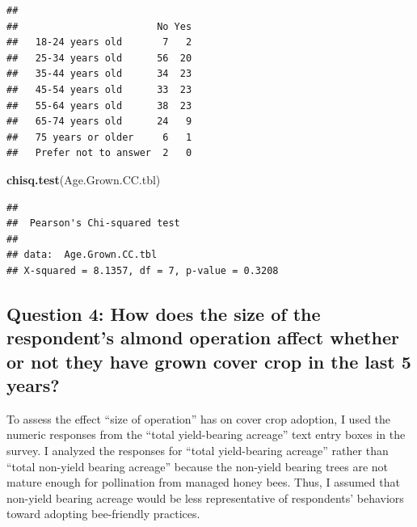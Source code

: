 \documentclass[12pt,]{article}
\newenvironment{Shaded}{\begin{snugshade}}{\end{snugshade}}
\newcommand{\KeywordTok}[1]{\textcolor[rgb]{0.13,0.29,0.53}{\textbf{#1}}}
\newcommand{\StringTok}[1]{\textcolor[rgb]{0.31,0.60,0.02}{#1}}
\newcommand{\CommentTok}[1]{\textcolor[rgb]{0.56,0.35,0.01}{\textit{#1}}}
\newcommand{\OperatorTok}[1]{\textcolor[rgb]{0.81,0.36,0.00}{\textbf{#1}}}
\newcommand{\NormalTok}[1]{#1}
\begin{document}
\FloatBarrier

\begin{Shaded}
\end{Shaded}

\begin{verbatim}
##                       
##                        No Yes
##   18-24 years old       7   2
##   25-34 years old      56  20
##   35-44 years old      34  23
##   45-54 years old      33  23
##   55-64 years old      38  23
##   65-74 years old      24   9
##   75 years or older     6   1
##   Prefer not to answer  2   0
\end{verbatim}

\begin{Shaded}
\begin{Highlighting}[]
\KeywordTok{chisq.test}\NormalTok{(Age.Grown.CC.tbl)}
\end{Highlighting}
\end{Shaded}

\begin{verbatim}
## 
##  Pearson's Chi-squared test
## 
## data:  Age.Grown.CC.tbl
## X-squared = 8.1357, df = 7, p-value = 0.3208
\end{verbatim}

\FloatBarrier

\subsection{Question 4: How does the size of the respondent's almond
operation affect whether or not they have grown cover crop in the last 5
years?}\label{question-4-how-does-the-size-of-the-respondents-almond-operation-affect-whether-or-not-they-have-grown-cover-crop-in-the-last-5-years}

To assess the effect ``size of operation'' has on cover crop adoption, I
used the numeric responses from the ``total yield-bearing acreage'' text
entry boxes in the survey. I analyzed the responses for ``total
yield-bearing acreage'' rather than ``total non-yield bearing acreage''
because the non-yield bearing trees are not mature enough for
pollination from managed honey bees. Thus, I assumed that non-yield
bearing acreage would be less representative of respondents' behaviors
toward adopting bee-friendly practices.
\end{document}
